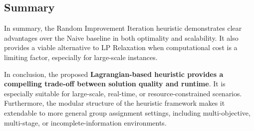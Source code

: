 \subsection{Summary}

In summary, the Random Improvement Iteration heuristic demonstrates clear advantages over the Naive baseline in both optimality and scalability. It also provides a viable alternative to LP Relaxation when computational cost is a limiting factor, especially for large-scale instances.

In conclusion, the proposed \textbf{Lagrangian-based heuristic provides a compelling trade-off between solution quality and runtime}. It is especially suitable for large-scale, real-time, or resource-constrained scenarios. Furthermore, the modular structure of the heuristic framework makes it extendable to more general group assignment settings, including multi-objective, multi-stage, or incomplete-information environments.
